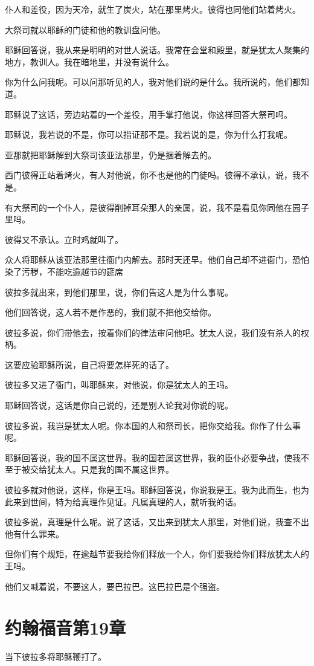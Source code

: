 \documentclass[12pt,oneside]{book}
\begin{document}
仆人和差役，因为天冷，就生了炭火，站在那里烤火。彼得也同他们站着烤火。

大祭司就以耶稣的门徒和他的教训盘问他。

耶稣回答说，我从来是明明的对世人说话。我常在会堂和殿里，就是犹太人聚集的地方，教训人。我在暗地里，并没有说什么。

你为什么问我呢。可以问那听见的人，我对他们说的是什么。我所说的，他们都知道。

耶稣说了这话，旁边站着的一个差役，用手掌打他说，你这样回答大祭司吗。

耶稣说，我若说的不是，你可以指证那不是。我若说的是，你为什么打我呢。

亚那就把耶稣解到大祭司该亚法那里，仍是捆着解去的。

西门彼得正站着烤火，有人对他说，你不也是他的门徒吗。彼得不承认，说，我不是。

有大祭司的一个仆人，是彼得削掉耳朵那人的亲属，说，我不是看见你同他在园子里吗。

彼得又不承认。立时鸡就叫了。

众人将耶稣从该亚法那里往衙门内解去。那时天还早。他们自己却不进衙门，恐怕染了污秽，不能吃逾越节的筵席

彼拉多就出来，到他们那里，说，你们告这人是为什么事呢。

他们回答说，这人若不是作恶的，我们就不把他交给你。

彼拉多说，你们带他去，按着你们的律法审问他吧。犹太人说，我们没有杀人的权柄。

这要应验耶稣所说，自己将要怎样死的话了。

彼拉多又进了衙门，叫耶稣来，对他说，你是犹太人的王吗。

耶稣回答说，这话是你自己说的，还是别人论我对你说的呢。

彼拉多说，我岂是犹太人呢。你本国的人和祭司长，把你交给我。你作了什么事呢。

耶稣回答说，我的国不属这世界。我的国若属这世界，我的臣仆必要争战，使我不至于被交给犹太人。只是我的国不属这世界。

彼拉多就对他说，这样，你是王吗。耶稣回答说，你说我是王。我为此而生，也为此来到世间，特为给真理作见证。凡属真理的人，就听我的话。

彼拉多说，真理是什么呢。说了这话，又出来到犹太人那里，对他们说，我查不出他有什么罪来。

但你们有个规矩，在逾越节要我给你们释放一个人，你们要我给你们释放犹太人的王吗。

他们又喊着说，不要这人，要巴拉巴。这巴拉巴是个强盗。

\chapter{约翰福音第19章}
当下彼拉多将耶稣鞭打了。
\end{document}
